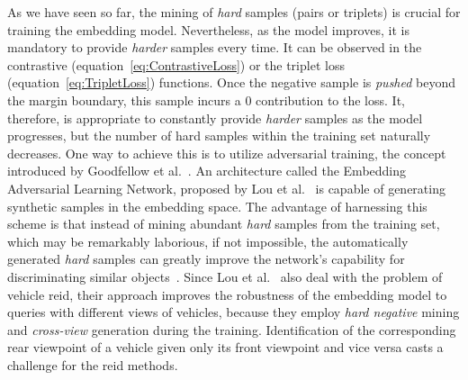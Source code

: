 As we have seen so far, the mining of \emph{hard} samples (pairs or triplets) is crucial for training the embedding model. Nevertheless, as the model improves, it is mandatory to provide \emph{harder} samples every time. It can be observed in the contrastive (equation~\ref{eq:ContrastiveLoss}) or the triplet loss (equation~\ref{eq:TripletLoss}) functions. Once the negative sample is \emph{pushed} beyond the margin boundary, this sample incurs a $0$ contribution to the loss. It, therefore, is appropriate to constantly provide \emph{harder} samples as the model progresses, but the number of hard samples within the training set naturally decreases. One way to achieve this is to utilize adversarial training, the concept introduced by Goodfellow et al.~\cite{goodfellow2014gans}. An architecture called the Embedding Adversarial Learning Network, proposed by Lou et al.~\cite{lou2019embreid} is capable of generating synthetic samples in the embedding space. The advantage of harnessing this scheme is that instead of mining abundant \emph{hard} samples from the training set, which may be remarkably laborious, if not impossible, the automatically generated \emph{hard} samples can greatly improve the network's capability for discriminating similar objects~\cite{lou2019embreid}. Since Lou et al.~\cite{lou2019embreid} also deal with the problem of vehicle \gls{reid}, their approach improves the robustness of the embedding model to queries with different views of vehicles, because they employ \emph{hard negative} mining and \emph{cross-view} generation during the training. Identification of the corresponding rear viewpoint of a vehicle given only its front viewpoint and vice versa casts a challenge for the \gls{reid} methods.

